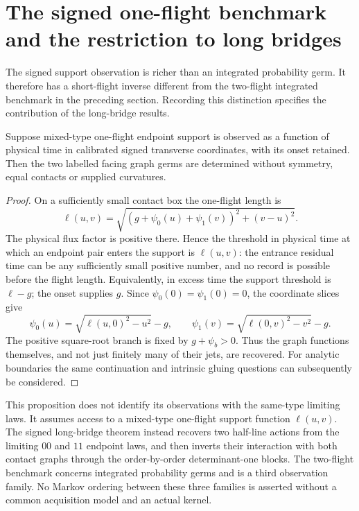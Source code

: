 \section{The signed one-flight benchmark and the restriction to long bridges}
\label{sec:v25-one-flight-benchmark}

The signed support observation is richer than an integrated probability
germ.  It therefore has a short-flight inverse different from the two-flight
integrated benchmark in the preceding section.  Recording this distinction
specifies the contribution of the long-bridge results.

\begin{proposition}
\label{prop:v25-one-flight-inverse}
Suppose mixed-type one-flight endpoint support is observed as a function of
physical time in calibrated signed transverse coordinates, with its onset
retained.  Then the two labelled facing graph germs are determined without
symmetry, equal contacts or supplied curvatures.
\end{proposition}

\begin{proof}
On a sufficiently small contact box the one-flight length is
\[
 \ell(u,v)=\sqrt{(g+\psi_0(u)+\psi_1(v))^2+(v-u)^2}.
\]
The physical flux factor is positive there.  Hence the threshold in physical
time at which an endpoint pair enters the support is \(\ell(u,v)\): the
entrance residual time can be any sufficiently small positive number, and
no record is possible before the flight length.  Equivalently, in excess
time the support threshold is \(\ell-g\); the onset supplies \(g\).
Since \(\psi_0(0)=\psi_1(0)=0\), the coordinate slices give
\begin{equation}\label{eq:v25-one-flight-inverse}
 \psi_0(u)=\sqrt{\ell(u,0)^2-u^2}-g,\qquad
 \psi_1(v)=\sqrt{\ell(0,v)^2-v^2}-g.
\end{equation}
The positive square-root branch is fixed by \(g+\psi_b>0\).
Thus the graph functions themselves, and not just finitely many of their
jets, are recovered.  For analytic boundaries the same continuation and
intrinsic gluing questions can subsequently be considered.
\end{proof}

This proposition does not identify its observations with the same-type
limiting laws.  It assumes access to a mixed-type one-flight support function
\(\ell(u,v)\).  The signed long-bridge theorem instead recovers two
half-line actions from the limiting \(00\) and \(11\) endpoint laws, and
then inverts their interaction with both contact graphs through the
order-by-order determinant-one blocks.  The two-flight benchmark concerns
integrated probability germs and is a third observation family.  No Markov
ordering between these three families is asserted without a common
acquisition model and an actual kernel.

